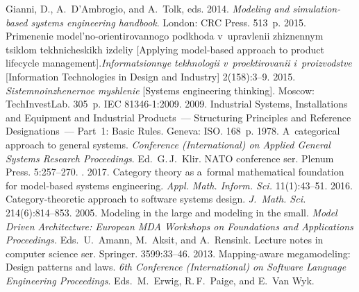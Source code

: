   \begin{multicols}{2}

\renewcommand{\bibname}{\protect\rmfamily References}

{\small\frenchspacing
 {%
 \begin{thebibliography}{99}
Gianni, D., A.~D'Ambrogio, and A.~Tolk, eds. 2014. \textit{Modeling and simulation-based 
systems engineering handbook}. London: CRC Press. 513~p.
 2015. Primenenie model'no-orientirovannogo podkhoda 
v~upravlenii zhiznennym tsiklom tekhnicheskikh izdeliy [Applying model-based approach 
to product lifecycle management].\linebreak \textit{Informatsionnye tekhnologii v~proektirovanii 
i~proizvod\-st\-ve} [Information Technologies in Design and Industry] 2(158):3--9.
 2015. 
\textit{Sistemnoinzhenernoe myshlenie} [Systems engineering thinking]. 
Moscow: TechInvestLab. 305~p.
IEC 81346-1:2009. 2009. 
Industrial Systems, Installations and Equipment and Industrial 
Products~--- Structuring Principles and Reference Designations~--- 
Part~1: Basic Rules. Geneva:  ISO. 168~p.
 1978. 
A~categorical approach to general systems. \textit{Conference 
(International) on Applied General Systems Research Proceedings}. Ed.\
 G.\,J.~Klir. \mbox{NATO}  conference ser. Plenum Press. 5:257--270.
\bibitem{6-kov-1}
. 
2017. Category theory as a~formal mathematical foundation for 
model-based systems engineering. \textit{Appl. Math.  Inform. Sci.} 11(1):43--51.
\bibitem{7-kov-1}
 2016. 
Category-theoretic approach to software systems design. \textit{J.~Math. Sci.} 
214(6):814--853.
 2005. Modeling in 
the large and modeling in the small. 
\textit{Model Driven Architecture: European MDA Workshops on 
Foundations and Applications Proceedings.} 
Eds.\ U.~\mbox{A{\!\ptb{\ss}}mann}, M.~Aksit, and A.~Rensink. 
Lecture notes in computer science ser. Springer. 3599:33--46.
 2013. 
Mapping-aware megamodeling: Design patterns 
and laws. \textit{6th Conference (International) on Software Language Engineering 
Proceedings}. Eds.\ M.~Erwig, R.\,F.~Paige, and E.~Van Wyk. 

\end{thebibliography}}}
\end{multicols}
